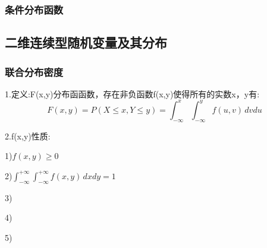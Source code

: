 \documentclass[11pt,twoside,a4paper]{ctexart}
\begin{document}
    \subsubsection{条件分布函数}

    \subsection{二维连续型随机变量及其分布}
    \subsubsection{联合分布密度}
    1.定义:F(x,y)分布函函数，存在非负函数f(x,y)使得所有的实数x，y有:
    \[F(x,y) = P(X\leq x,Y\leq y) = \int_{-\infty}^x\int_{-\infty}^yf(u,v)\,dvdu\]
    
    2.f(x,y)性质:
    \begin{minipage}[t]{0.9\linewidth}
        1)$f(x,y)\geq 0$

        2)$\int_{-\infty}^{+\infty}\int_{-\infty}^{+\infty}f(x,y)\,dxdy = 1$

        3)

        4)

        5)
    \end{minipage}
\end{document}
